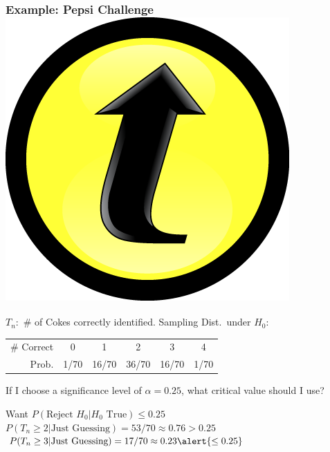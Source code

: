 \documentclass[handout]{beamer}
\begin{document}
\begin{frame}
\frametitle{Example: Pepsi Challenge \hfill \includegraphics[scale = 0.05]{./images/clicker}}
$T_n\colon$ \# of Cokes correctly identified. Sampling Dist.\ under $H_0$:
		\begin{center}
		\begin{tabular}{rccccc}
		\hline
		\# Correct & 0 & 1 & 2 & 3 & 4\\
		Prob.&1/70 & 16/70 & 36/70 & 16/70 &1/70\\
		\hline
		\end{tabular}
	\end{center}
	\alert{If I choose a significance level of $\alpha =0.25$, what critical value should I use?}
	\pause
	
	\vspace{2em}
	Want $P(\mbox{Reject } H_0|H_0 \mbox{ True})\leq 0.25$\\ 
	$P(T_n \geq 2 |\mbox{Just Guessing}) = 53/70 \approx 0.76 > 0.25$ 
	$P(T_n \geq 3 |\mbox{Just Guessing}) = 17/70 \approx 0.23 \alert{\leq 0.25}$ 
\end{frame}
\end{document}

